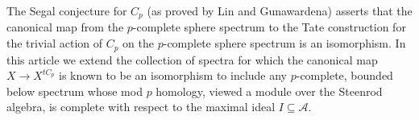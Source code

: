 The Segal conjecture for $C_p$ (as proved by Lin and Gunawardena) asserts that the canonical map from the $p$-complete sphere spectrum to the Tate construction for the trivial action of $C_p$ on the $p$-complete sphere spectrum is an isomorphism. 
    In this article we extend the collection of spectra for which the canonical map $X \to X^{tC_p}$ is known to be an isomorphism to include any $p$-complete, bounded below spectrum whose mod $p$ homology, viewed a module over the Steenrod algebra, is complete with respect to the maximal ideal $I \subseteq \mathcal{A}$.
